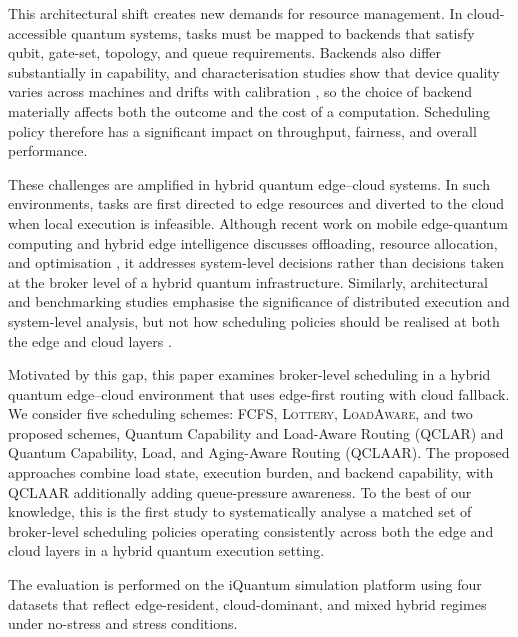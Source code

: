 \documentclass[preprint,12pt]{elsarticle}
\newcommand{\QCLAR}{\textsc{QCLAR}}
\newcommand{\QCLAAR}{\textsc{QCLAAR}}
\newcommand{\LoadAware}{\textsc{LoadAware}}
\newcommand{\FCFS}{\textsc{FCFS}}
\newcommand{\Lottery}{\textsc{Lottery}}
\begin{document}
This architectural shift creates new demands for resource management. In
cloud-accessible quantum systems, tasks must be mapped to backends that satisfy
qubit, gate-set, topology, and queue requirements. Backends also differ
substantially in capability, and characterisation studies show that device
quality varies across machines and drifts with calibration
\cite{proctor2025, magesan2011, magesan2012}, so the choice of backend
materially affects both the outcome and the cost of a computation. Scheduling
policy therefore has a significant impact on throughput, fairness, and overall
performance.

These challenges are amplified in hybrid quantum edge--cloud systems. In such
environments, tasks are first directed to edge resources and diverted to the
cloud when local execution is infeasible. Although recent work on mobile
edge-quantum computing and hybrid edge intelligence discusses offloading,
resource allocation, and optimisation \cite{xu2025, huang2024}, it addresses
system-level decisions rather than decisions taken at the broker level of a
hybrid quantum infrastructure. Similarly, architectural and benchmarking studies
emphasise the significance of distributed execution and system-level analysis,
but not how scheduling policies should be realised at both the edge and cloud
layers \cite{yao2025, li2020, finzgar2024}.

Motivated by this gap, this paper examines broker-level scheduling in a hybrid
quantum edge--cloud environment that uses edge-first routing with cloud
fallback. We consider five scheduling schemes: \FCFS{}, \Lottery{},
\LoadAware{}, and two proposed schemes, Quantum Capability and Load-Aware
Routing (\QCLAR{}) and Quantum Capability, Load, and Aging-Aware Routing
(\QCLAAR{}). The proposed approaches combine load state, execution burden, and
backend capability, with \QCLAAR{} additionally adding queue-pressure awareness.
To the best of our knowledge, this is the first study to systematically analyse
a matched set of broker-level scheduling policies operating consistently across
both the edge and cloud layers in a hybrid quantum execution setting.

The evaluation is performed on the iQuantum simulation platform \cite{nguyen2024}
using four datasets that reflect edge-resident, cloud-dominant, and mixed hybrid
regimes under no-stress and stress conditions.
\end{document}
